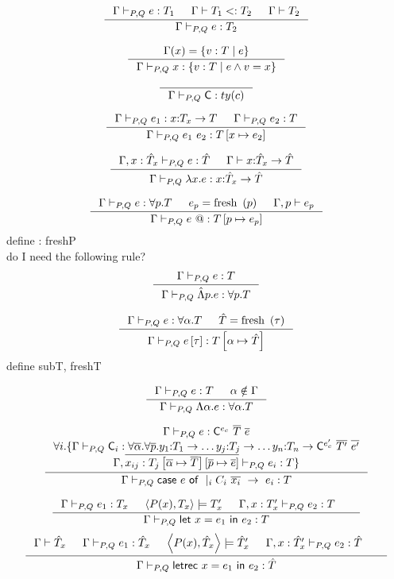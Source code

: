 \documentclass[10pt,a4paper]{article}
\newcommand\highlight[2]{{\setlength\fboxsep{1pt}\colorbox{#1}{#2}}}
\def\NV{\highlight{colorNV}}
\begin{document}
$$
\inference{
	\hasType{\Gamma}{P,Q}{e}{\dTy_1} &
	\isSubType{\Gamma}{\dTy_1}{\dTy_2} &
	\isWellFormed{\Gamma}{\dTy_2}
}{
	\hasType{\Gamma}{P,Q}{e}{\dTy_2}
}[]
$$

$$
\inference{
	\Gamma(x) = \refa{v}{\dTy}{e}
}{
	\hasType{\Gamma}{P,Q}{x}{\refa{v}{\dTy}{e \land v = x}}
}[]
$$

$$
\inference{
}{
	\hasType{\Gamma}{P,Q}{\nhaskell{C}}{ty(c)}
}[]
$$

$$
\inference{
	\hasType{\Gamma}{P,Q}{e_1}{\tfun{x}{\dTy_x}{\dTy}} &
	\hasType{\Gamma}{P,Q}{e_2}{\dTy}
}{
	\hasType{\Gamma}{P,Q}{\eapp{e_1}{e_2}}{\dTy \sub{x}{e_2}}
}[]
$$

$$
\inference{
	\hasType{\Gamma, x:\lTy_x}{P,Q}{e}{\lTy} &
	\isWellFormed{\Gamma}{\tfun{x}{\lTy_x}{\lTy}}
}{
	\hasType{\Gamma}{P,Q}{\elam{x}{e}}{\tfun{x}{\lTy_x}{\lTy}}
}[]
$$


$$
\inference{
	\hasType{\Gamma}{P,Q}{e}{\tforallPr{p}{\dTy}} &
	e_p = \freshP{p} &
	\isWellFormedP{\Gamma}{p}{e_p}
}{
	\hasType{\Gamma}{P,Q}{\epapp{e}}{\dTy \subP{p}{e_p}}
}[]
$$
\NV{define : freshP}\\
\NV{do I need the following rule?}
$$
\inference{
	\hasType{\Gamma}{P,Q}{e}{\dTy} 
}{
	\hasType{\Gamma}{P,Q}{\eplam{p}{e}}{\tforallPr{p}{\dTy}}
}[]
$$

$$
\inference{
	\hasType{\Gamma}{P,Q}{e}{\tforallTy{\alpha}{\dTy}} &
	\lTy = \freshT{\tau}
}{
	\hasType{\Gamma}{P,Q}{\etapp{e}{\tau}}{\dTy \subT{\alpha}{\lTy}}
}[]
$$
\NV{define subT, freshT}

$$
\inference{
	\hasType{\Gamma}{P,Q}{e}{\dTy} &
	\alpha \notin \Gamma 
}{
	\hasType{\Gamma}{P,Q}{\etlam{\alpha}{e}}{\tforallTy{\alpha}{\dTy}}
}[]
$$

$$
\inference{
	\hasType{\Gamma}{P,Q}{e}
		{\tcon{\nhaskell{C}}{e_c}{\listOf{\dTy}}{\listOf{e}}} \\
	\forall i . \{
		\hasType{\Gamma}{P,Q}{\nhaskell{C}_i}
			{\tforallTy{\listOf{\alpha}}{\tforallPr{\listOf{p}}{
				\tfun{y_1}{\dTy_1}{
				\tfun{\dots y_j}{\dTy_j}{
				\tfun{\dots y_n}{\dTy_n}{
				\tcon{\nhaskell{C}}{e'_c}{\listOf{\dTy'}}{\listOf{e'}}}}}			
			}}} \\			
		\hasType{\Gamma, \listOf{x_{ij} : {\dTy_j \subT{\listOf{\alpha}}{\listOf{\dTy}}\subP{\listOf{p}}{\listOf{e}} }}}{P,Q}{e_i}{\dTy}	
	\}
}{
	\hasType{\Gamma}{P,Q}{\ecase{e}{C_i \ \listOf{x_i}}{e_i}}{\dTy}
}[]
$$

$$
\inference{
	\hasType{\Gamma}{P,Q}{e_1}{\dTy_x} &
	\unifyTypes{P(x)}{\dTy_x}{\dTy_x'} &
	\hasType{\Gamma,x:\dTy_x'}{P,Q}{e_2}{\dTy} &
}{
	\hasType{\Gamma}{P,Q}{\elet{x}{e_1}{e_2}}{\dTy}
}[]
$$
$$
\inference{
	\isWellFormed{\Gamma}{\lTy_x} &
	\hasType{\Gamma}{P,Q}{e_1}{\lTy_x} &
	\unifyTypes{P(x)}{\lTy_x}{\lTy_x'} &
	\hasType{\Gamma,x:\lTy_x'}{P,Q}{e_2}{\lTy} &
}{
	\hasType{\Gamma}{P,Q}{\eletrec{x}{e_1}{e_2}}{\lTy}
}[]
$$
\end{document}
